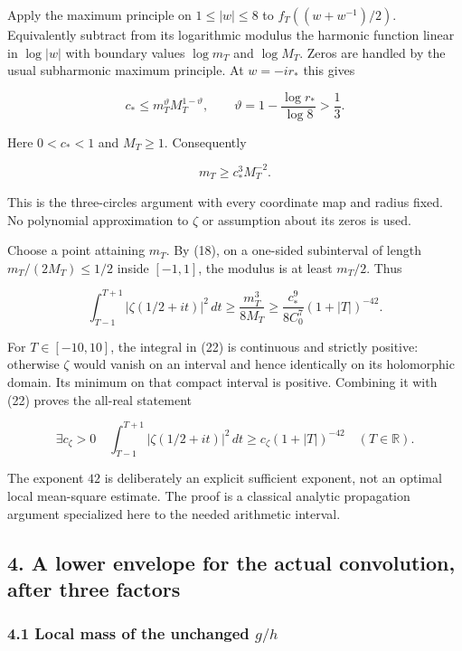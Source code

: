 \documentclass[11pt,a4paper]{article}
\begin{document}
Apply the maximum principle on \(1\le|w|\le8\) to \(f_T((w+w^{-1})/2)\). Equivalently subtract from its logarithmic modulus the harmonic function linear in \(\log|w|\) with boundary values \(\log m_T\) and \(\log M_T\). Zeros are handled by the usual subharmonic maximum principle. At \(w=-ir_*\) this gives

\[
 c_*\le m_T^{\vartheta}M_T^{1-\vartheta},\qquad
 \vartheta=1-\frac{\log r_*}{\log8}>\frac13.
                                                                         \tag{20}
\]

Here \(0<c_*<1\) and \(M_T\ge1\). Consequently

\[
 m_T\ge c_*^3M_T^{-2}.                                                 \tag{21}
\]

This is the three-circles argument with every coordinate map and radius fixed. No polynomial approximation to \(\zeta\) or assumption about its zeros is used.

Choose a point attaining \(m_T\). By (18), on a one-sided subinterval of length \(m_T/(2M_T)\le1/2\) inside \([-1,1]\), the modulus is at least \(m_T/2\). Thus

\[
 \int_{T-1}^{T+1}|\zeta(1/2+it)|^2\,dt
 \ge \frac{m_T^3}{8M_T}
 \ge \frac{c_*^9}{8C_0^7}(1+|T|)^{-42}.                                \tag{22}
\]

For \(T\in[-10,10]\), the integral in (22) is continuous and strictly positive: otherwise \(\zeta\) would vanish on an interval and hence identically on its holomorphic domain. Its minimum on that compact interval is positive. Combining it with (22) proves the all-real statement

\[
 \boxed{\exists c_\zeta>0\quad
 \int_{T-1}^{T+1}|\zeta(1/2+it)|^2\,dt
 \ge c_\zeta(1+|T|)^{-42}\quad(T\in\mathbb R).}                         \tag{23}
\]

The exponent \(42\) is deliberately an explicit sufficient exponent, not an optimal local mean-square estimate. The proof is a classical analytic propagation argument specialized here to the needed arithmetic interval.

\subsection{4. A lower envelope for the actual convolution, after three factors}\label{zlm:endpoint-arithmetic_original--a-lower-envelope-for-the-actual-convolution-after-three-factors}

\subsubsection{\texorpdfstring{4.1 Local mass of the unchanged \(g/h\)}{4.1 Local mass of the unchanged }}\label{zlm:endpoint-arithmetic_original--local-mass-of-the-unchanged-gh}
\end{document}
